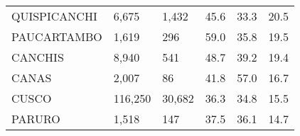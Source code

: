 \begin{tabular}{llllll}
	\cellcolor[HTML]{FF5050}QUISPICANCHI                           & 6,675                                                                 & 1,432                                                            & 45.6                                                                             & 33.3                                                                        & 20.5                                                                                \\
	\cellcolor[HTML]{FF5050}PAUCARTAMBO                            & 1,619                                                                 & 296                                                              & 59.0                                                                             & 35.8                                                                        & 19.5                                                                                \\
	\cellcolor[HTML]{FF5050}CANCHIS                                & 8,940                                                                 & 541                                                              & 48.7                                                                             & 39.2                                                                        & 19.4                                                                                \\
	\cellcolor[HTML]{FF5050}CANAS                                  & 2,007                                                                 & 86                                                               & 41.8                                                                             & 57.0                                                                        & 16.7                                                                                \\
	\cellcolor[HTML]{F8CBAD}CUSCO                                  & 116,250                                                               & 30,682                                                           & 36.3                                                                             & 34.8                                                                        & 15.5                                                                                \\
	\cellcolor[HTML]{F8CBAD}PARURO                                 & 1,518                                                                 & 147                                                              & 37.5                                                                             & 36.1                                                                        & 14.7                                                                                \\

\end{tabular}
